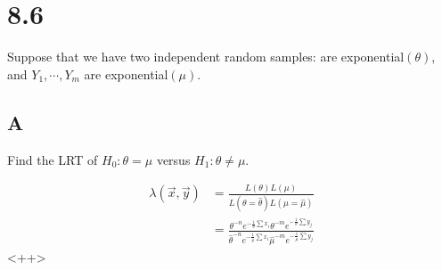 \section*{8.6}

Suppose that we have two independent random samples: \rs are exponential$(\theta)$, and $Y_1, \cdots, Y_m$ are exponential$(\mu)$.

\subsection*{A}

Find the LRT of $H_0: \theta = \mu$ versus $H_1: \theta \neq \mu$.

\begin{align*}
	\lambda(\vec{x}, \vec{y}) &= \frac{L(\theta)L(\mu)}{L(\theta = \hat{\theta})L(\mu = \hat{\mu})} \\
	&= \frac
	{\theta^{-n} e^{-\frac{1}{\theta} \sum x_i} \theta^{-m} e^{-\frac{1}{\theta} \sum y_j}}
	{\hat{\theta}^{-n} e^{-\frac{1}{\hat{\theta}} \sum x_i} \hat{\mu}^{-m} e^{-\frac{1}{\hat{\mu}} \sum y_j}}
\end{align*}<++>
